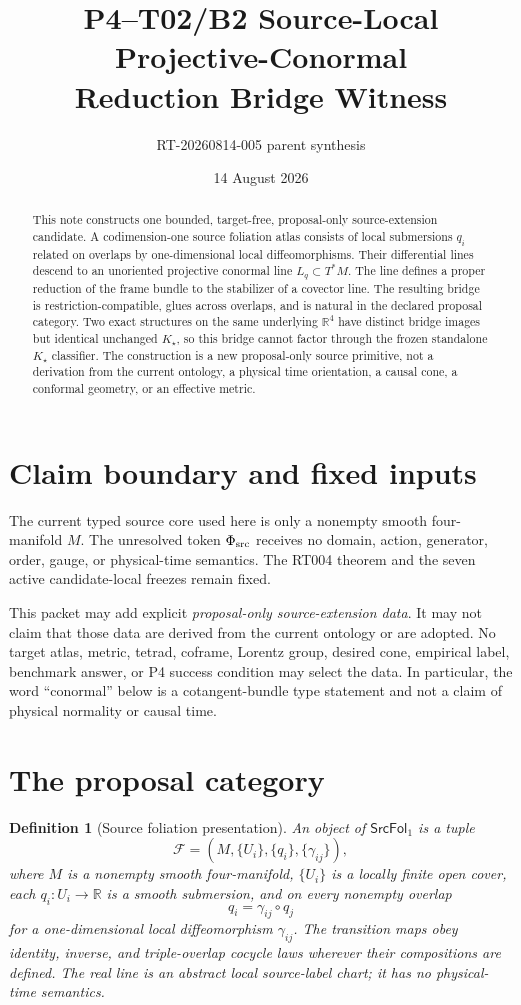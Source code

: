 \documentclass[11pt]{article}
\title{P4--T02/B2 Source-Local Projective-Conormal\\Reduction Bridge Witness}
\author{RT-20260814-005 parent synthesis}
\date{14 August 2026}
\newtheorem{definition}{Definition}
\newcommand{\Kstar}{K_{\star}}
\begin{document}
\maketitle

\begin{abstract}
This note constructs one bounded, target-free, proposal-only source-extension
candidate.  A codimension-one source foliation atlas consists of local
submersions $q_i$ related on overlaps by one-dimensional local
diffeomorphisms.  Their differential lines descend to an unoriented
projective conormal line $L_q\subset T^*M$.  The line defines a proper
reduction of the frame bundle to the stabilizer of a covector line.  The
resulting bridge is restriction-compatible, glues across overlaps, and is
natural in the declared proposal category.  Two exact structures on the same
underlying $\mathbb R^4$ have distinct bridge images but identical unchanged
$\Kstar$, so this bridge cannot factor through the frozen standalone
$\Kstar$ classifier.  The construction is a new proposal-only source
primitive, not a derivation from the current ontology, a physical time
orientation, a causal cone, a conformal geometry, or an effective metric.
\end{abstract}

\section{Claim boundary and fixed inputs}

The current typed source core used here is only a nonempty smooth
four-manifold $M$.  The unresolved token $\Phi_{\rm src}$ receives no domain,
action, generator, order, gauge, or physical-time semantics.  The RT004
theorem and the seven active candidate-local freezes remain fixed.

This packet may add explicit \emph{proposal-only source-extension data}.  It
may not claim that those data are derived from the current ontology or are
adopted.  No target atlas, metric, tetrad, coframe, Lorentz group, desired
cone, empirical label, benchmark answer, or P4 success condition may select
the data.  In particular, the word ``conormal'' below is a cotangent-bundle
type statement and not a claim of physical normality or causal time.

\section{The proposal category}

\begin{definition}[Source foliation presentation]
An object of $\mathsf{SrcFol}_1$ is a tuple
\[
 \mathcal F=(M,\{U_i\},\{q_i\},\{\gamma_{ij}\}),
\]
where $M$ is a nonempty smooth four-manifold, $\{U_i\}$ is a locally finite
open cover, each $q_i:U_i\to\mathbb R$ is a smooth submersion, and on every
nonempty overlap
\[
 q_i=\gamma_{ij}\circ q_j
\]
for a one-dimensional local diffeomorphism $\gamma_{ij}$.  The transition
maps obey identity, inverse, and triple-overlap cocycle laws wherever their
compositions are defined.  The real line is an abstract local source-label
chart; it has no physical-time semantics.
\end{definition}
\end{document}
